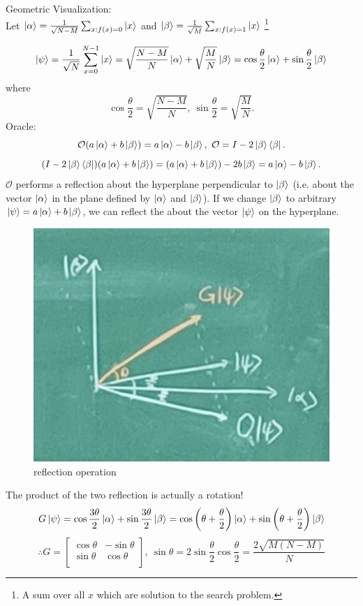 \documentclass[]{book}
\theoremstyle{nonumberplain}
\begin{document}
Geometric Visualization:\\
Let $\ket{\alpha}=\frac{1}{\sqrt{N-M}}\sum_{x:f(x)=0} \ket{x} $ and $\ket{\beta} = \frac{1}{\sqrt{M}}\sum_{x:f(x)=1} \ket{x} $ \footnote{A sum over all $x$ which are solution to the search problem.}

$$\ket{\psi}=\frac{1}{\sqrt{N}}\sum_{x=0}^{N-1} \ket{x} = \sqrt{\frac{N-M}{N}} \ket{\alpha} + \sqrt{\frac{M}{N}} \ket{\beta} = \cos{\frac{\theta}{2}} \ket{\alpha} + \sin{\frac{\theta}{2}}\ket{\beta}$$
where
$$\cos{\frac{\theta}{2}}=\sqrt{\frac{N-M}{N}}, \ \sin{\frac{\theta}{2}}=\sqrt{\frac{M}{N}}.$$
Oracle:
$$\mathcal{O}(a\ket{\alpha}+b\ket{\beta}) = a\ket{\alpha}-b\ket{\beta}, \ \mathcal{O} = I-2\ket{\beta}\bra{\beta}.$$
$$( I-2\ket{\beta}\bra{\beta} ) ( a\ket{\alpha}+b\ket{\beta} )
= (a\ket{\alpha}+b\ket{\beta}) - 2 b \ket{\beta} = a\ket{\alpha}-b\ket{\beta}.$$
$\mathcal{O}$ performs a reflection about the hyperplane perpendicular to $\ket{\beta}$ (i.e. about the vector $\ket{\alpha}$ in the plane defined by $\ket{\alpha}$ and $\ket{\beta}$). If we change $\ket{\beta}$ to arbitrary $\ket{\psi} = a\ket{\alpha}+b\ket{\beta}$, we can reflect 
the about the vector $\ket{\psi}$ on the hyperplane.\\
\begin{figure}
    \centering
    \includegraphics[width=.4\linewidth]{graph/20231207_162134.jpg}
    \caption{reflection operation}
    \label{fig:enter-label}
\end{figure}
The product of the two reflection is actually a rotation!
$$G\ket{\psi}=\cos{\frac{3\theta}{2}}\ket{\alpha} + \sin{\frac{3\theta}{2}}\ket{\beta}
= \cos{\left(\theta + \frac{\theta}{2}\right)}\ket{\alpha} + \sin{\left(\theta + \frac{\theta}{2}\right)}\ket{\beta}$$
$$\therefore G=
    \left[
\begin{matrix}
    \cos{\theta} & -\sin{\theta} \\
    \sin{\theta} & \cos{\theta} \\
\end{matrix}
    \right]
, \ \sin{\theta} = 2 \sin{\frac{\theta}{2}}\cos{\frac{\theta}{2}} = \frac{2\sqrt{M(N-M)}}{N}
$$
\end{document}
